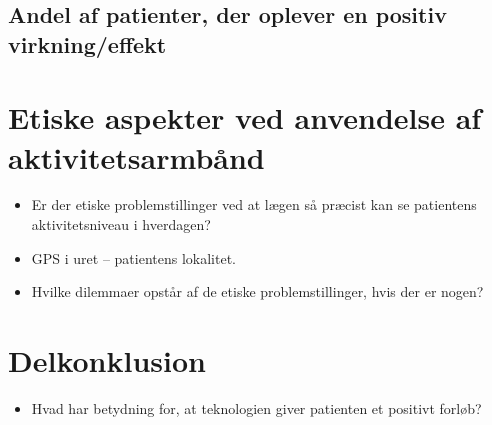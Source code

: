 \subsection{Andel af patienter, der oplever en positiv virkning/effekt}

\section{Etiske aspekter ved anvendelse af aktivitetsarmbånd}
\begin{itemize}
\item Er der etiske problemstillinger ved at lægen så præcist kan se patientens aktivitetsniveau i hverdagen?
\item GPS i uret – patientens lokalitet.
\item Hvilke dilemmaer opstår af de etiske problemstillinger, hvis der er nogen?
\end{itemize}

\section{Delkonklusion}
\begin{itemize}
\item Hvad har betydning for, at teknologien giver patienten et positivt forløb?
\end{itemize}

